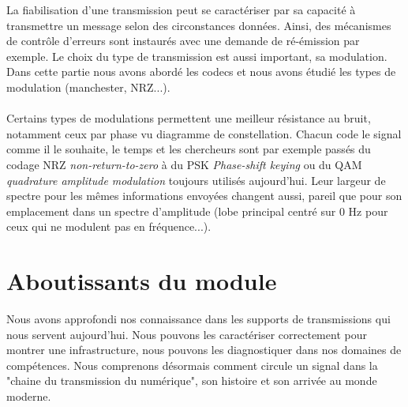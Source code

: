 La fiabilisation d'une transmission peut se caractériser par sa capacité à transmettre un message selon des circonstances données. Ainsi, des mécanismes de contrôle d'erreurs sont instaurés avec une demande de ré-émission par exemple. Le choix du type de transmission est aussi important, sa modulation. Dans cette partie nous avons abordé les codecs et nous avons étudié les types de modulation (manchester, NRZ...).
\\ \\
Certains types de modulations permettent une meilleur résistance au bruit, notamment ceux par phase vu diagramme de constellation. Chacun code le signal comme il le souhaite, le temps et les chercheurs sont par exemple passés du codage NRZ \textit{non-return-to-zero} à du PSK \textit{Phase-shift keying} ou du QAM \textit{quadrature amplitude modulation} toujours utilisés aujourd'hui. Leur largeur de spectre pour les mêmes informations envoyées changent aussi, pareil que pour son emplacement dans un spectre d'amplitude (lobe principal centré sur 0 Hz pour ceux qui ne modulent pas en fréquence...).

\section{Aboutissants du module}

Nous avons approfondi nos connaissance dans les supports de transmissions qui nous servent aujourd'hui. Nous pouvons les caractériser correctement pour montrer une infrastructure, nous pouvons les diagnostiquer dans nos domaines de compétences. Nous comprenons désormais comment circule un signal dans la "chaine du transmission du numérique", son histoire et son arrivée au monde moderne.